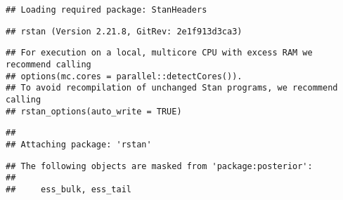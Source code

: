 \documentclass[
]{article}
\begin{document}
\begin{verbatim}
## Loading required package: StanHeaders
\end{verbatim}

\begin{verbatim}
## rstan (Version 2.21.8, GitRev: 2e1f913d3ca3)
\end{verbatim}

\begin{verbatim}
## For execution on a local, multicore CPU with excess RAM we recommend calling
## options(mc.cores = parallel::detectCores()).
## To avoid recompilation of unchanged Stan programs, we recommend calling
## rstan_options(auto_write = TRUE)
\end{verbatim}

\begin{verbatim}
## 
## Attaching package: 'rstan'
\end{verbatim}

\begin{verbatim}
## The following objects are masked from 'package:posterior':
## 
##     ess_bulk, ess_tail
\end{verbatim}
\end{document}
